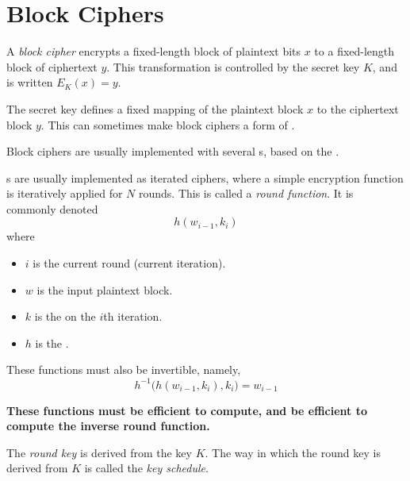 \section{Block Ciphers}\label{sec:Block_Ciphers}
\begin{definition}\label{def:Block_Cipher}
  A \emph{block cipher} encrypts a fixed-length block of plaintext bits $x$ to a fixed-length block of ciphertext $y$.
  This transformation is controlled by the secret key $K$, and is written $E_{K}(x) = y$.

  The secret key defines a fixed mapping of the plaintext block $x$ to the ciphertext block $y$.
  This can sometimes make block ciphers a form of .

  Block ciphers are usually implemented with several s, based on the .
\end{definition}

\begin{definition}\label{def:Round_Function}
  s are usually implemented as iterated ciphers, where a simple encryption function is iteratively applied for $N$ rounds.
  This is called a \emph{round function}.
  It is commonly denoted
  \begin{equation}\label{eq:Round_Function}
    h(w_{i-1}, k_{i})
  \end{equation}
  where
  \begin{itemize}[noitemsep]
  \item $i$ is the current round (current iteration).
  \item $w$ is the input plaintext block.
  \item $k$ is the  on the $i$th iteration.
  \item $h$ is the .
  \end{itemize}

  These functions must also be invertible, namely,
  \begin{equation}\label{eq:Round_Function_Invertible}
    h^{-1} \bigl( h(w_{i-1}, k_{i}), k_{i} \bigr) = w_{i-1}
  \end{equation}

  \textbf{These functions must be efficient to compute, and be efficient to compute the inverse round function.}
\end{definition}

\begin{definition}\label{def:Round_Key}
  The \emph{round key} is derived from the key $K$.
  The way in which the round key is derived from $K$ is called the \emph{key schedule}.
\end{definition}

